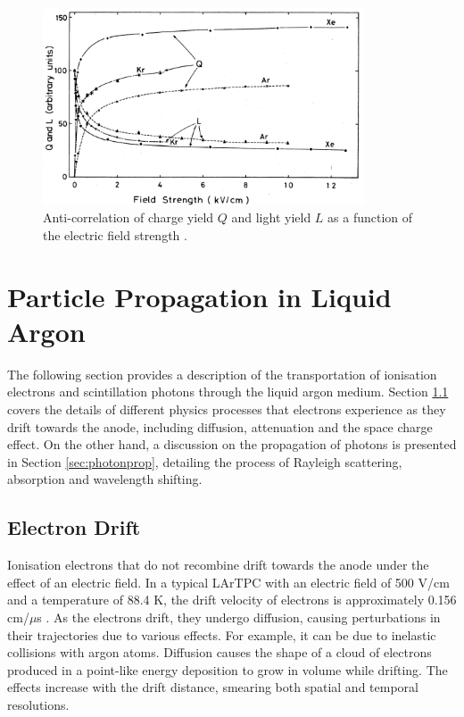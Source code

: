 \begin{figure}[ht!] 
\centering    
\includegraphics[width=0.85\textwidth]{QLAnti}
\caption[Charge and Light Yield as a Function of Electric Field]{
Anti-correlation of charge yield $Q$ and light yield $L$ as a function of the electric field strength \cite{QLAnti}.
}
\label{fig:QLAnti}
\end{figure}

\section{Particle Propagation in Liquid Argon}
\label{sec3:propagation}

The following section provides a description of the transportation of ionisation electrons and scintillation photons through the liquid argon medium.
Section \ref{sec:edrift} covers the details of different physics processes that electrons experience as they drift towards the anode, including diffusion, attenuation and the space charge effect.
On the other hand, a discussion on the propagation of photons is presented in Section \ref{sec:photonprop}, detailing the process of Rayleigh scattering, absorption and wavelength shifting.

\subsection{Electron Drift}
\label{sec:edrift}


Ionisation electrons that do not recombine drift towards the anode under the effect of an electric field.
In a typical LArTPC with an electric field of 500 V/cm and a temperature of 88.4 K, the drift velocity of electrons is approximately 0.156 cm/$\mu$s \cite{drift_vel}.
As the electrons drift, they undergo diffusion, causing perturbations in their trajectories due to various effects.
For example, it can be due to inelastic collisions with argon atoms.
Diffusion causes the shape of a cloud of electrons produced in a point-like energy deposition to grow in volume while drifting.
The effects increase with the drift distance, smearing both spatial and temporal resolutions. 

